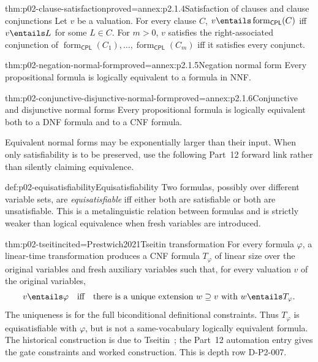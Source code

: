 \begin{hblemma}{thm:p02-clause-satisfaction}{proved=annex:p2.1.4}{Satisfaction of clauses and clause conjunctions}
Let \(v\) be a valuation.  For every clause \(C\),
\(v\entails\operatorname{form}_{\mathsf{CPL}}(C)\) iff
\(v\entails L\) for some \(L\in C\).  For \(m>0\), \(v\) satisfies the
right-associated conjunction of
\(\operatorname{form}_{\mathsf{CPL}}(C_1),\ldots,
\operatorname{form}_{\mathsf{CPL}}(C_m)\) iff it satisfies every conjunct.
\end{hblemma}

\begin{hbtheorem}{thm:p02-negation-normal-form}{proved=annex:p2.1.5}{Negation normal form}
Every propositional formula is logically equivalent to a formula in NNF.
\end{hbtheorem}

\begin{hbtheorem}{thm:p02-conjunctive-disjunctive-normal-form}{proved=annex:p2.1.6}{Conjunctive and disjunctive normal forms}
Every propositional formula is logically equivalent both to a DNF formula and
to a CNF formula.
\end{hbtheorem}

Equivalent normal forms may be exponentially larger than their input.  When
only satisfiability is to be preserved, use the following Part~12 forward
link rather than silently claiming equivalence.

\begin{hbdefinition}{def:p02-equisatisfiability}{Equisatisfiability}
Two formulas, possibly over different variable sets, are
\emph{equisatisfiable} iff either both are satisfiable or both are
unsatisfiable.  This is a metalinguistic relation between formulas and is
strictly weaker than logical equivalence when fresh variables are introduced.
\end{hbdefinition}

\begin{hbtheorem}{thm:p02-tseitin}{cited=Prestwich2021}{Tseitin transformation}
For every formula \(\varphi\), a linear-time transformation produces a CNF
formula \(T_\varphi\) of linear size over the original variables and fresh
auxiliary variables such that, for every valuation \(v\) of the original
variables,
\[
 v\entails\varphi
 \quad\text{iff}\quad
 \text{there is a unique extension }w\supseteq v
 \text{ with }w\entails T_\varphi.
\]
The uniqueness is for the full biconditional definitional constraints.  Thus
\(T_\varphi\) is equisatisfiable with \(\varphi\), but is not a
same-vocabulary logically equivalent formula.  The historical construction is
due to Tseitin~\cite{Tseitin1968}; the Part~12 automation entry gives the gate
constraints and worked construction.  This is depth row D-P2-007.
\end{hbtheorem}

